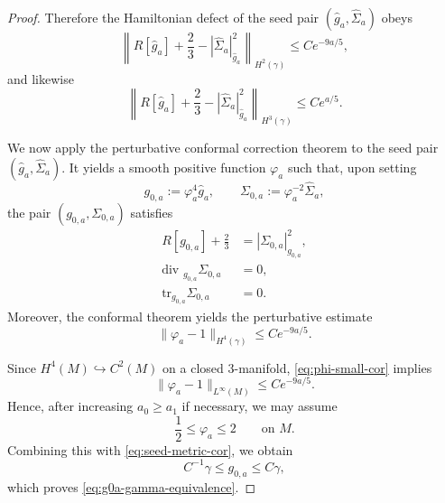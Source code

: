 \documentclass{amsart}
\renewcommand{\div}{\mbox{div }}
\newcommand{\tr}{\mbox{tr}}
\begin{document}
\begin{proof}
\noindent Therefore the Hamiltonian defect of the seed pair \((\widehat g_{a},\widehat\Sigma_{a})\) obeys
\begin{equation}
\label{eq:seed-defect-cor}
\left\|R[\widehat g_{a}]+\frac23-|\widehat\Sigma_{a}|_{\widehat g_{a}}^{2}\right\|_{H^{2}(\gamma)}
\le C e^{-9a/5},
\end{equation}
and likewise
\begin{equation}
\label{eq:seed-defect-H3-cor}
\left\|R[\widehat g_{a}]+\frac23-|\widehat\Sigma_{a}|_{\widehat g_{a}}^{2}\right\|_{H^{3}(\gamma)}
\le C e^{a/5}.
\end{equation}

\medskip

\noindent
We now apply the perturbative conformal correction theorem to the seed pair \((\widehat g_{a},\widehat\Sigma_{a})\). It yields a smooth positive function \(\varphi_{a}\) such that, upon setting
\begin{equation}
\label{eq:conformal-cor}
g_{0,a}:=\varphi_{a}^{4}\widehat g_{a},
\qquad
\Sigma_{0,a}:=\varphi_{a}^{-2}\widehat\Sigma_{a},
\end{equation}
the pair \((g_{0,a},\Sigma_{0,a})\) satisfies
\begin{align}
R[g_{0,a}]+\frac23&=|\Sigma_{0,a}|_{g_{0,a}}^{2},\\
\div_{g_{0,a}}\Sigma_{0,a}&=0,\\
\tr_{g_{0,a}}\Sigma_{0,a}&=0.
\end{align}
Moreover, the conformal theorem yields the perturbative estimate
\begin{equation}
\label{eq:phi-small-cor}
\|\varphi_{a}-1\|_{H^{4}(\gamma)}\le C e^{-9a/5}.
\end{equation}

\noindent Since \(H^{4}(M)\hookrightarrow C^{2}(M)\) on a closed \(3\)-manifold, \eqref{eq:phi-small-cor} implies
\[
\|\varphi_{a}-1\|_{L^{\infty}(M)}\le C e^{-9a/5}.
\]
\noindent Hence, after increasing \(a_{0}\ge a_{1}\) if necessary, we may assume
\[
\frac12\le \varphi_{a}\le 2
\qquad\text{on }M.
\]
Combining this with \eqref{eq:seed-metric-cor}, we obtain
\[
C^{-1}\gamma\le g_{0,a}\le C\gamma,
\]
which proves \eqref{eq:g0a-gamma-equivalence}.

\medskip


\end{proof}
\end{document}
